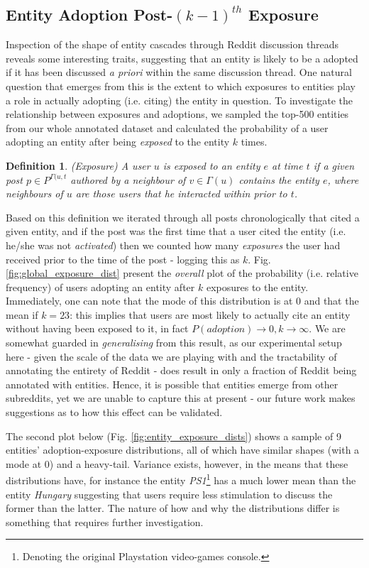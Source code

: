 \documentclass[journal,10pt,draftclsnofoot,onecolumn]{IEEEtran}
\newtheorem{mydef}{Definition}
\begin{document}
\subsection{Entity Adoption Post-$({k-1})^{th}$ Exposure}
Inspection of the shape of entity cascades through Reddit discussion threads reveals some interesting traits, suggesting that an entity is likely to be a adopted if it has been discussed \emph{a priori} within the same discussion thread.
One natural question that emerges from this is the extent to which exposures to entities play a role in actually adopting (i.e. citing) the entity in question.
To investigate the relationship between exposures and adoptions, we sampled the top-500 entities from our whole annotated dataset and calculated the probability of a user adopting an entity after being \emph{exposed} to the entity $k$ times.

\begin{mydef}
\label{def:exposure}
(Exposure) A user $u$ is exposed to an entity $e$ at time $t$ if a given post $p \in P^{\Gamma(u,t}$ authored by a neighbour of $v \in \Gamma(u)$ contains the entity $e$, where neighbours of $u$ are those users that he interacted within prior to $t$.
\end{mydef}

Based on this definition we iterated through all posts chronologically that cited a given entity, and if the post was the first time that a user cited the entity (i.e. he/she was not \emph{activated}) then we counted how many \emph{exposures} the user had received prior to the time of the post - logging this as $k$.
Fig. \ref{fig:global_exposure_dist} present the \emph{overall} plot of the probability (i.e. relative frequency) of users adopting an entity after $k$ exposures to the entity.
Immediately, one can note that the mode of this distribution is at $0$ and that the mean if $k=23$: this implies that users are most likely to actually cite an entity without having been exposed to it, in fact $P(adoption) \rightarrow 0, k \rightarrow \infty$.
We are somewhat guarded in \emph{generalising} from this result, as our experimental setup here - given the scale of the data we are playing with and the tractability of annotating the entirety of Reddit - does result in only a fraction of Reddit being annotated with entities.
Hence, it is possible that entities emerge from other subreddits, yet we are unable to capture this at present - our future work makes suggestions as to how this effect can be validated.

The second plot below (Fig. \ref{fig:entity_exposure_dists}) shows a sample of 9 entities' adoption-exposure distributions, all of which have similar shapes (with a mode at $0$) and a heavy-tail.
Variance exists, however, in the means that these distributions have, for instance the entity \emph{PS1}\footnote{Denoting the original Playstation video-games console.} has a much lower mean than the entity \emph{Hungary} suggesting that users require less stimulation to discuss the former than the latter.
The nature of how and why the distributions differ is something that requires further investigation.
\end{document}
